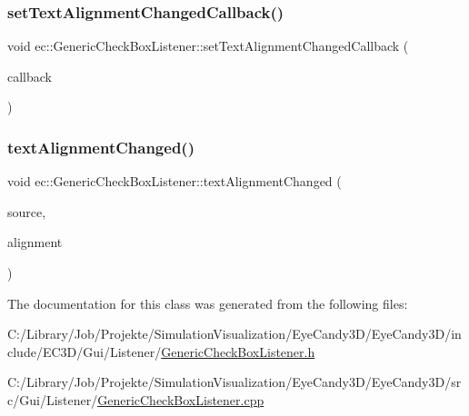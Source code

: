\subsubsection{\texorpdfstring{set\+Text\+Alignment\+Changed\+Callback()}{setTextAlignmentChangedCallback()}}
{\footnotesize\ttfamily void ec\+::\+Generic\+Check\+Box\+Listener\+::set\+Text\+Alignment\+Changed\+Callback (\begin{DoxyParamCaption}\item[{const \mbox{\hyperlink{classec_1_1_generic_check_box_listener_ab297fca8dea2b6edefe0c8d97c24c090}{Text\+Alignment\+Changed\+\_\+\+Callback}} \&}]{callback }\end{DoxyParamCaption})}

\mbox{\label{classec_1_1_generic_check_box_listener_abe00afb238e730d9e88c14e540f209ca}} 
\subsubsection{\texorpdfstring{text\+Alignment\+Changed()}{textAlignmentChanged()}}
{\footnotesize\ttfamily void ec\+::\+Generic\+Check\+Box\+Listener\+::text\+Alignment\+Changed (\begin{DoxyParamCaption}\item[{agui\+::\+Check\+Box $\ast$}]{source,  }\item[{agui\+::\+Area\+Alignment\+Enum}]{alignment }\end{DoxyParamCaption})\hspace{0.3cm}{\ttfamily [override]}}



The documentation for this class was generated from the following files\+:\begin{DoxyCompactItemize}
\item 
C\+:/\+Library/\+Job/\+Projekte/\+Simulation\+Visualization/\+Eye\+Candy3\+D/\+Eye\+Candy3\+D/include/\+E\+C3\+D/\+Gui/\+Listener/\mbox{\hyperlink{_generic_check_box_listener_8h}{Generic\+Check\+Box\+Listener.\+h}}\item 
C\+:/\+Library/\+Job/\+Projekte/\+Simulation\+Visualization/\+Eye\+Candy3\+D/\+Eye\+Candy3\+D/src/\+Gui/\+Listener/\mbox{\hyperlink{_generic_check_box_listener_8cpp}{Generic\+Check\+Box\+Listener.\+cpp}}\end{DoxyCompactItemize}
